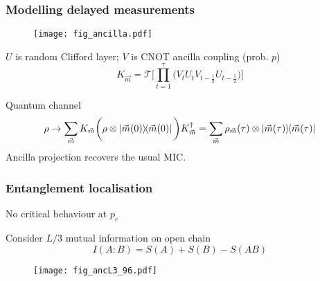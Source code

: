 \documentclass[9pt]{beamer}
\begin{document}


\begin{frame}
\frametitle{Modelling delayed measurements}

\begin{figure}
\centering
\texttt{[image: fig\_ancilla.pdf]}
\end{figure}

\pause
$U$ is random Clifford layer; $V$ is CNOT ancilla coupling (prob. $p$)
\begin{equation}
K_{\vec{m}} = \mathcal{T} \bigg[ \prod_{t=1}^\tau \bigg(V_t U_t V_{t-\frac{1}{2}} U_{t-\frac{1}{2}}\bigg) \bigg]
\end{equation}

\pause
Quantum channel
\begin{equation}
\rho \rightarrow
\sum_{\vec{m}} K_{\vec{m}} \bigg(\rho \otimes \dyad{\vec{m}(0)}\bigg) K_{\vec{m}}^\dagger 
= \sum_{\vec{m}} \rho_{\vec{m}} (\tau) \otimes \dyad{\vec{m}(\tau)}
\end{equation}
Ancilla projection recovers the usual MIC.

\end{frame}


\begin{frame}
\frametitle{Entanglement localisation}

No critical behaviour at $p_c$

\pause
Consider $L/3$ mutual information on open chain
\begin{equation}
I(A:B) = S(A) + S(B) - S(AB)
\end{equation}
\begin{figure}
\centering
\texttt{[image: fig\_ancL3\_96.pdf]}
\end{figure}


\end{frame}

\end{document}
